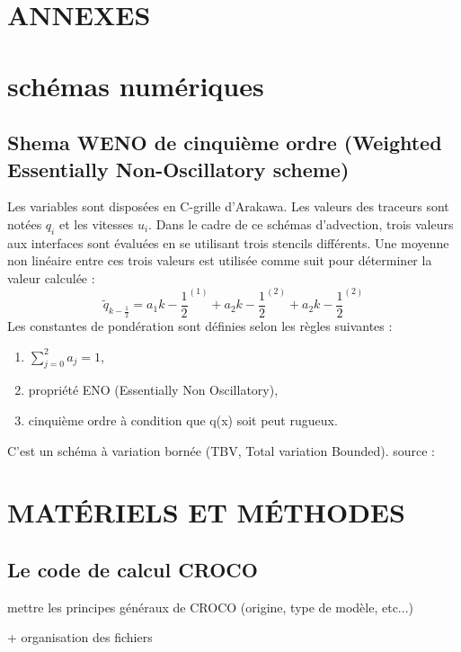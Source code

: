 \documentclass[10pt,a4paper,titlepage]{article}
\begin{document}
\newpage
\section*{ANNEXES}

\section{schémas numériques}
\subsection{Shema WENO de cinquième ordre (Weighted Essentially Non-Oscillatory scheme)}\label{WENO}
Les variables sont disposées en C-grille d'Arakawa.
Les valeurs des traceurs sont notées $q_i$ et les vitesses $u_i$.
Dans le cadre de ce schémas d'advection, trois valeurs aux interfaces sont évaluées en se utilisant trois stencils différents. Une moyenne non linéaire entre ces trois valeurs est utilisée comme suit pour déterminer la valeur calculée :
$$\tilde{q}_{k-\frac{1}{2}} = a_1k-\frac{1}{2}^{(1)} + a_2k-\frac{1}{2}^{(2)} + a_2k-\frac{1}{2}^{(2)}$$
Les constantes de pondération sont définies selon les règles suivantes :
\begin{enumerate}
	\item $\sum_{j=0}^{2}a_j = 1$,
	\item propriété ENO (Essentially Non Oscillatory),
	\item cinquième ordre à condition que q(x) soit peut rugueux.
\end{enumerate}
C'est un schéma à variation bornée (TBV, Total variation Bounded).
source : \cite{schemas_advection}


\section{MATÉRIELS ET MÉTHODES}

\subsection{Le code de calcul CROCO}

mettre les principes généraux de CROCO (origine, type de modèle, etc...)

+ organisation des fichiers
\end{document}
